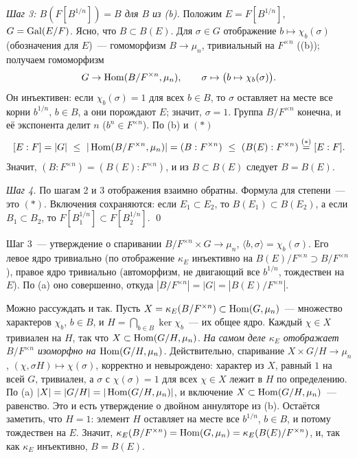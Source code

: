 \emph{Шаг 3: $B(F[B^{1/n}])=B$ для $B$ из (b).} Положим $E=F[B^{1/n}]$, $G=\operatorname{Gal}(E/F)$. Ясно, что $B\subset B(E)$.
Для $\sigma\in G$ отображение $b\mapsto\chi_b(\sigma)$ (обозначения  для $E$)~--- гомоморфизм $B\to\mu_n$,
тривиальный на $F^{\times n}$ ((b)); получаем гомоморфизм
\[
G\to\operatorname{Hom}(B/F^{\times n},\mu_n),\qquad\sigma\mapsto\bigl(b\mapsto\chi_b(\sigma)\bigr).
\]
Он инъективен: если $\chi_b(\sigma)=1$ для всех $b\in B$, то $\sigma$ оставляет на месте все корни $b^{1/n}$, $b\in B$, а
они порождают $E$; значит, $\sigma=1$. Группа $B/F^{\times n}$ конечна, и её экспонента делит $n$ ($b^n\in
F^{\times n}$). По (b) и $(*)$
\[
[E:F]=|G|\ \le\ |\operatorname{Hom}(B/F^{\times n},\mu_n)|=(B:F^{\times n})\ \le\ (B(E):F^{\times n})\overset{(*)}{=}[E:F].
\]
Значит, $(B:F^{\times n})=(B(E):F^{\times n})$, и из $B\subset B(E)$ следует $B=B(E)$.

\emph{Шаг 4.} По шагам 2 и 3 отображения взаимно обратны. Формула для степени~--- это $(*)$. Включения сохраняются:
если $E_1\subset E_2$, то $B(E_1)\subset B(E_2)$, а если $B_1\subset B_2$, то $F[B_1^{1/n}]\subset F[B_2^{1/n}]$.
\qed

\begin{remark}
Шаг 3~--- утверждение о спаривании $B/F^{\times n}\times G\to\mu_n$, $\langle b,\sigma\rangle=\chi_b(\sigma)$. Его левое
ядро тривиально (по  отображение $\kappa_E$ инъективно на $B(E)/F^{\times n}\supset B/F^{\times n}$), правое ядро
тривиально (автоморфизм, не двигающий все $b^{1/n}$, тождествен на $E$). По (a) оно совершенно, откуда
$|B/F^{\times n}|=|G|=|B(E)/F^{\times n}|$.

Можно рассуждать и так. Пусть $X=\kappa_E(B/F^{\times n})\subset\operatorname{Hom}(G,\mu_n)$~--- множество характеров $\chi_b$, $b\in B$,
и $H=\bigcap_{b\in B}\ker\chi_b$~--- их общее ядро. Каждый $\chi\in X$ тривиален на $H$, так что $X\subset
\operatorname{Hom}(G/H,\mu_n)$. \emph{На самом деле $\kappa_E$ отображает $B/F^{\times n}$ изоморфно на $\operatorname{Hom}(G/H,\mu_n)$.}
Действительно, спаривание $X\times G/H\to\mu_n$, $(\chi,\sigma H)\mapsto\chi(\sigma)$, корректно и невырождено: характер из
$X$, равный $1$ на всей $G$, тривиален, а $\sigma$ с $\chi(\sigma)=1$ для всех $\chi\in X$ лежит в $H$ по определению. По
(a) $|X|=|G/H|=|\operatorname{Hom}(G/H,\mu_n)|$, и включение $X\subset\operatorname{Hom}(G/H,\mu_n)$~--- равенство. Это и есть утверждение о
двойном аннуляторе из (b). Остаётся заметить, что $H=1$: элемент $H$ оставляет на месте все $b^{1/n}$, $b\in B$,
и потому тождествен на $E$. Значит, $\kappa_E(B/F^{\times n})=\operatorname{Hom}(G,\mu_n)=\kappa_E(B(E)/F^{\times n})$, и, так как
$\kappa_E$ инъективно, $B=B(E)$.
\end{remark}

